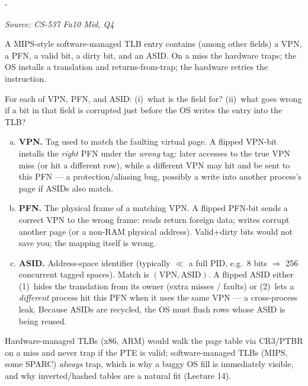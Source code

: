\documentclass[11pt,a4paper]{article}
\makeatletter
\newcommand{\keepspace}[1]{\par\penalty-100\begingroup
  \setlength{\dimen@}{#1}\dimen@ii\pagegoal\advance\dimen@ii-\pagetotal
  \ifdim\dimen@>\dimen@ii\ifdim\dimen@ii>\z@\vfil\fi\break\fi\endgroup}
\newcounter{qn}[section]
\newenvironment{Qn}[4]{%
  \refstepcounter{qn}\keepspace{7\baselineskip}%
  \begin{tcolorbox}[qboxstyle, title={Q\thesection.\theqn\ \ [#1 \textbar\ #2]\ \ #4}]%
  {\footnotesize\color{g3}\textit{Source: #3}}\par\smallskip%
}{%
  \end{tcolorbox}%
}
\newenvironment{Sol}{%
  \begin{tcolorbox}[sboxstyle, title={Solution}]%
}{%
  \end{tcolorbox}\vspace{0.35em}%
}
\makeatother
\begin{document}
\begin{Qn}{Medium-Hard}{Lect 13}{CS-537 Fa10 Mid, Q4}{Software-managed TLB entry: VPN, PFN, ASID}
A MIPS-style software-managed TLB entry contains (among other fields) a
VPN, a PFN, a valid bit, a dirty bit, and an ASID. On a miss the hardware
traps; the OS installs a translation and returns-from-trap; the hardware
retries the instruction.

For each of VPN, PFN, and ASID: (i)~what is the field for?
(ii)~what goes wrong if a bit in that field is corrupted just before the
OS writes the entry into the TLB?
\end{Qn}
\begin{Sol}
\begin{enumerate}[(a)]
\item \textbf{VPN.} Tag used to match the faulting virtual page.
      A flipped VPN-bit installs the \emph{right} PFN under the
      \emph{wrong} tag: later accesses to the true VPN miss (or hit a
      different row), while a different VPN may hit and be sent to this
      PFN --- a protection/aliasing bug, possibly a write into another
      process's page if ASIDs also match.
\item \textbf{PFN.} The physical frame of a matching VPN.
      A flipped PFN-bit sends a correct VPN to the wrong frame: reads
      return foreign data; writes corrupt another page (or a non-RAM
      physical address). Valid+dirty bits would not save you; the
      mapping itself is wrong.
\item \textbf{ASID.} Address-space identifier (typically $\ll$ a full
      PID, e.g.\ 8 bits $\Rightarrow$ 256 concurrent tagged spaces).
      Match is $(\mathrm{VPN},\mathrm{ASID})$. A flipped ASID either
      (1)~hides the translation from its owner (extra misses / faults)
      or (2)~lets a \emph{different} process hit this PFN when it uses
      the same VPN --- a cross-process leak. Because ASIDs are recycled,
      the OS must flush rows whose ASID is being reused.
\end{enumerate}
Hardware-managed TLBs (x86, ARM) would walk the page table via CR3/PTBR
on a miss and never trap if the PTE is valid; software-managed TLBs
(MIPS, some SPARC) \emph{always} trap, which is why a buggy OS fill is
immediately visible, and why inverted/hashed tables are a natural fit
(Lecture 14).
\end{Sol}
\end{document}
